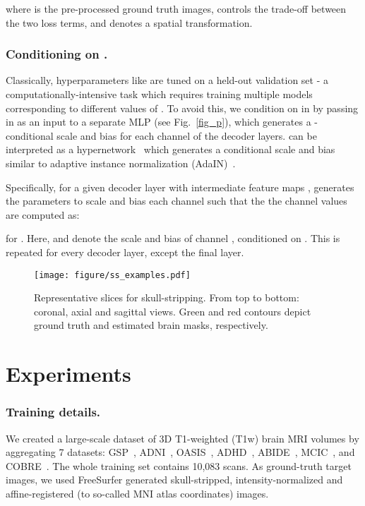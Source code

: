 \documentclass[runningheads]{llncs}
\begin{document}
where  is the pre-processed ground truth images,  controls the trade-off between the two loss terms, and  denotes a spatial transformation.



\subsubsection{Conditioning on .}
Classically, hyperparameters like  are tuned on a held-out validation set - a computationally-intensive task which requires training multiple models corresponding to different values of . 
To avoid this, we condition on  in  by passing in  as an input to a separate MLP  (see Fig.~\ref{fig_p}), which generates a -conditional scale and bias for each channel of the decoder layers. 
 can be interpreted as a hypernetwork~\cite{Ha2016,wang2022computing,Hoopes2021} which generates a conditional scale and bias similar to adaptive instance normalization (AdaIN)~\cite{huang2017arbitrary}.

Specifically, for a given decoder layer with  intermediate feature maps ,  generates 
the parameters to scale and bias each channel  such that the the channel values are computed as:

for .
Here,  and  denote the scale and bias of channel , conditioned on . 
This is repeated for every decoder layer, except the final layer.



\begin{figure}[t!]
\centering
\texttt{[image: figure/ss\_examples.pdf]}
\caption{Representative slices for skull-stripping. From top to bottom: coronal, axial and sagittal views. Green and red contours depict ground truth and estimated brain masks, respectively.} \label{fig1}
\end{figure}

\section{Experiments}

\subsubsection{Training details.} 
We created a large-scale dataset of 3D T1-weighted (T1w) brain MRI volumes by aggregating 7 datasets: GSP~\cite{Holmes2015}, ADNI~\cite{mueller2005alzheimer}, OASIS~\cite{marcus2010open}, ADHD~\cite{adhd}, ABIDE~\cite{de2017alzheimer}, MCIC~\cite{Gollub2013}, and COBRE~\cite{Aine2017}. 
The whole training set contains 10,083 scans. 
As ground-truth target images, we used FreeSurfer generated skull-stripped, intensity-normalized and affine-registered (to so-called MNI atlas coordinates) images.
\end{document}
